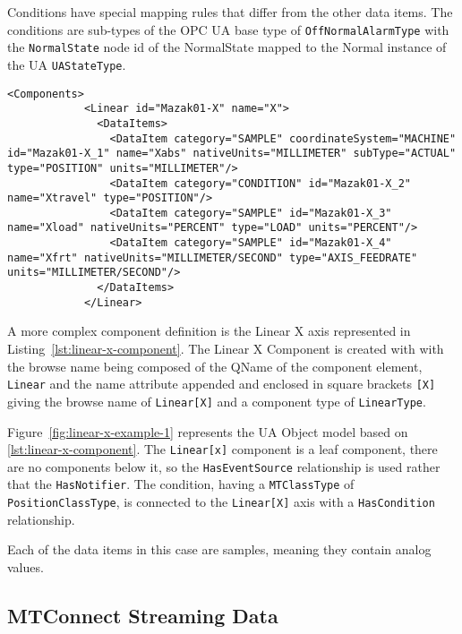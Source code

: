 Conditions have special mapping rules that differ from the other data items. The conditions are sub-types of the OPC UA base type of \texttt{OffNormalAlarmType} with the \texttt{NormalState} node id of the NormalState mapped to the Normal instance of the UA \texttt{UAStateType}.

\begin{lstlisting}[firstnumber=last,%
    caption={Linear X Component},label={lst:linear-x-component}]
          <Components>
            <Linear id="Mazak01-X" name="X">
              <DataItems>
                <DataItem category="SAMPLE" coordinateSystem="MACHINE" id="Mazak01-X_1" name="Xabs" nativeUnits="MILLIMETER" subType="ACTUAL" type="POSITION" units="MILLIMETER"/>
                <DataItem category="CONDITION" id="Mazak01-X_2" name="Xtravel" type="POSITION"/>
                <DataItem category="SAMPLE" id="Mazak01-X_3" name="Xload" nativeUnits="PERCENT" type="LOAD" units="PERCENT"/>
                <DataItem category="SAMPLE" id="Mazak01-X_4" name="Xfrt" nativeUnits="MILLIMETER/SECOND" type="AXIS_FEEDRATE" units="MILLIMETER/SECOND"/>
              </DataItems>
            </Linear>
\end{lstlisting}

A more complex component definition is the Linear X axis represented in Listing~\ref{lst:linear-x-component}. The Linear X Component is created with with the browse name being composed of the QName of the component element, \texttt{Linear} and the name attribute appended and enclosed in square brackets \texttt{[X]} giving the browse name of \texttt{Linear[X]} and a component type of \texttt{LinearType}.



Figure~\ref{fig:linear-x-example-1} represents the UA Object model based on \ref{lst:linear-x-component}. The \texttt{Linear[x]} component is a leaf component, there are no components below it, so the \texttt{HasEventSource} relationship is used rather that the \texttt{HasNotifier}. The condition, having a \texttt{MTClassType} of \texttt{PositionClassType}, is connected to the \texttt{Linear[X]} axis with a \texttt{HasCondition} relationship.

Each of the data items in this case are samples, meaning they contain analog values.

\FloatBarrier

\subsection{MTConnect Streaming Data}

